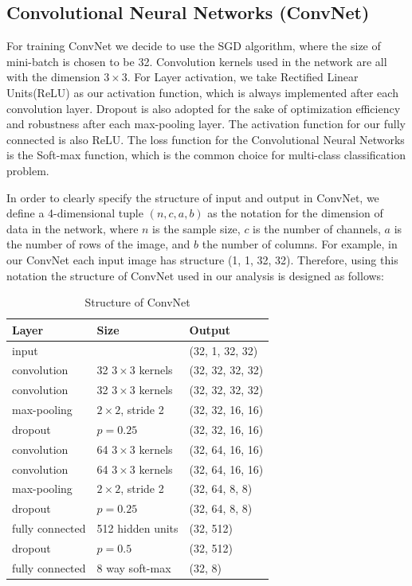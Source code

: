 \documentclass[11pt,oneside,a4paper]{article}
\numberwithin{equation}{section}
\begin{document}
\subsection{Convolutional Neural Networks (ConvNet)}
For training ConvNet we decide to use the SGD algorithm, where the size of mini-batch is chosen to be 32. Convolution kernels used in the network are all with the dimension $3 \times 3$. For Layer activation, we take Rectified Linear Units(ReLU) as our activation function, which is always implemented after each convolution layer. Dropout is also adopted for the sake of optimization efficiency and robustness after each max-pooling layer. The activation function for our fully connected is also ReLU. The loss function for the Convolutional Neural Networks is the Soft-max function, which is the common choice for multi-class classification problem.

In order to clearly specify the structure of input and output in ConvNet, we define a 4-dimensional tuple $(n, c, a, b)$ as the notation for the dimension of data in the network, where $n$ is the sample size, $c$ is the number of channels, $a$ is the number of rows of the image, and $b$ the number of columns. For example, in our ConvNet each input image has structure (1, 1, 32, 32). Therefore, using this notation the structure of ConvNet used in our analysis is designed as follows:

\begin{table}[ht]
\centering
\small
\caption{Structure of ConvNet}
\begin{tabular}{lll}
\toprule
Layer & Size & Output \\
\midrule
input & & (32, 1, 32, 32) \\
convolution & 32 $3\times3$ kernels & (32, 32, 32, 32) \\
convolution & 32 $3\times3$ kernels & (32, 32, 32, 32) \\
max-pooling & $2 \times 2$, stride 2 & (32, 32, 16, 16) \\
dropout & $p = 0.25$ & (32, 32, 16, 16) \\
convolution & 64 $3\times3$ kernels & (32, 64, 16, 16) \\
convolution & 64 $3\times3$ kernels & (32, 64, 16, 16) \\
max-pooling & $2 \times 2$, stride 2 & (32, 64, 8, 8) \\
dropout & $p = 0.25$ & (32, 64, 8, 8) \\
fully connected & 512 hidden units & (32, 512)\\
dropout & $p = 0.5$ & (32, 512) \\
fully connected & 8 way soft-max & (32, 8)\\
\bottomrule
\end{tabular}
\end{table}
\end{document}
